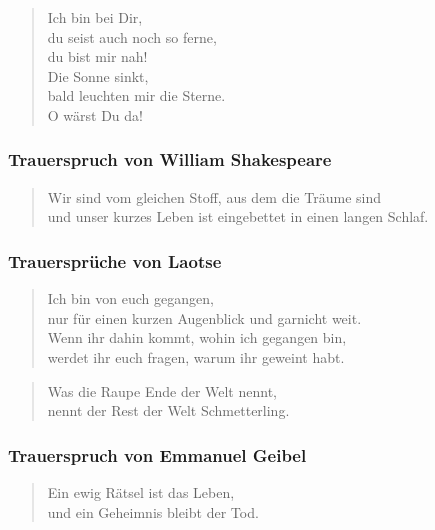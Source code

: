 \documentclass[ngerman,a4paper,11pt]{scrreprt}
\begin{document}
\begin{verse}
Ich bin bei Dir, \\
du seist auch noch so ferne, \\
du bist mir nah! \\
Die Sonne sinkt, \\
bald leuchten mir die Sterne. \\
O wärst Du da! \\
\end{verse}

\subsubsection*{Trauerspruch von William Shakespeare}
\label{sec-2-1-2-3-14}

\begin{verse}
Wir sind vom gleichen Stoff, aus dem die Träume sind \\
und unser kurzes Leben ist eingebettet in einen langen Schlaf. \\
\end{verse}

\subsubsection*{Trauersprüche von Laotse}
\label{sec-2-1-2-3-15}

\begin{verse}
Ich bin von euch gegangen, \\
nur für einen kurzen Augenblick und garnicht weit. \\
Wenn ihr dahin kommt, wohin ich gegangen bin, \\
werdet ihr euch fragen, warum ihr geweint habt. \\
\end{verse}

\begin{verse}
Was die Raupe Ende der Welt nennt, \\
nennt der Rest der Welt Schmetterling. \\
\end{verse}

\subsubsection*{Trauerspruch von Emmanuel Geibel}
\label{sec-2-1-2-3-16}

\begin{verse}
Ein ewig Rätsel ist das Leben, \\
und ein Geheimnis bleibt der Tod. \\
\end{verse}
\end{document}
